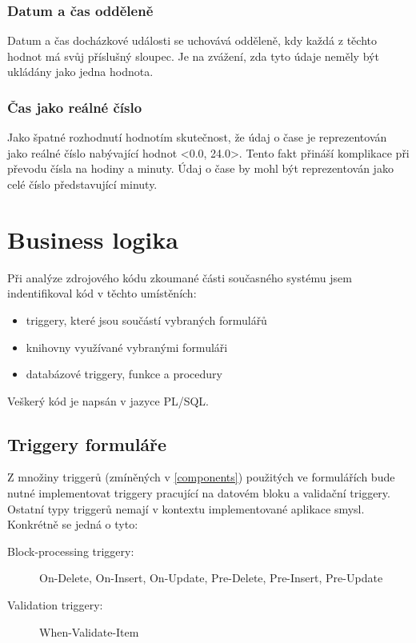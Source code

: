 \documentclass{diplomka}
\begin{document}
\subsubsection*{Datum a čas odděleně}
Datum a čas docházkové události se uchovává odděleně, kdy každá z těchto hodnot má svůj příslušný sloupec. Je na zvážení, zda tyto údaje neměly být ukládány jako jedna hodnota.

\subsubsection*{Čas jako reálné číslo}
Jako špatné rozhodnutí hodnotím skutečnost, že údaj o čase je reprezentován jako reálné číslo nabývající hodnot <0.0, 24.0>.  Tento fakt přináší komplikace při převodu čísla na hodiny a minuty. Údaj o čase by mohl být reprezentován jako celé číslo představující minuty.

\section{Business logika}
Při analýze zdrojového kódu zkoumané části současného systému jsem indentifikoval kód v těchto umístěních:
\vspace{-2mm}
\begin{itemize}%
\item triggery, které jsou součástí vybraných formulářů
\item knihovny využívané vybranými formuláři
\item databázové triggery, funkce a procedury
\end{itemize}
Veškerý kód je napsán v jazyce PL/SQL.
\subsection{Triggery formuláře}
Z množiny triggerů (zmíněných v \ref{components}) použitých ve formulářích bude nutné implementovat triggery pracující na datovém bloku a validační triggery. Ostatní typy triggerů nemají v kontextu implementované aplikace smysl. Konkrétně se jedná o tyto:

\begin{description}
\item [Block-processing triggery:] On-Delete, On-Insert, On-Update, Pre-Delete, Pre-Insert, Pre-Update
\item [Validation triggery:] When-Validate-Item
\end{description}
\end{document}

